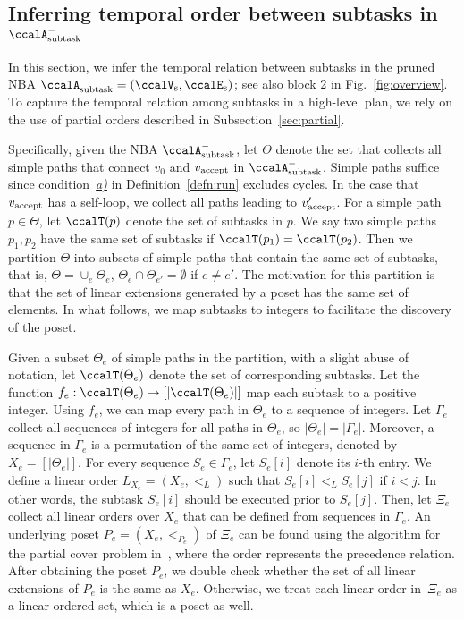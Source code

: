 \documentclass[Afour,sageh,times]{sagej}
\newcommand{\auto}[1]{\ccalA_{\textup{#1}}}
\newcommand{\vertex}[1]{v_{\textup{#1}}}
\begin{document}

\subsection{Inferring temporal order between subtasks in  $\auto{subtask}^-$}\label{sec:poset}
In this section,  we infer the temporal relation between subtasks in the pruned NBA $\auto{subtask}^- = (\ccalV_\text{s}, \ccalE_\text{s})$; see also block 2 in Fig.~\ref{fig:overview}.  To capture the temporal relation among subtasks in a high-level plan,  we rely on the use of partial orders described in Subsection~\ref{sec:partial}.


Specifically, given the NBA $\auto{subtask}^-$, let $\Theta$ denote the set that collects all simple paths that connect $v_0$ and $\vertex{accept}$ in $\auto{subtask}^-$. Simple paths suffice since condition~\hyperref[cond:a]{\it a)} in Definition~\ref{defn:run} excludes cycles. In the case that $\vertex{accept}$ has a self-loop, we collect all paths leading to $\vertex{accept}'$.
For a simple path $p\in\Theta$, let $\ccalT(p)$ denote the set of subtasks in $p$. We say two simple paths $p_1, p_2$ have the same set of subtasks if $\ccalT(p_1) =\ccalT(p_2)$. Then we partition $\Theta$ into subsets of  simple paths that contain the same set of subtasks, that is, $\Theta = \cup_e \Theta_e$, $\Theta_e \cap \Theta_{e'} = \emptyset$ if $e\not=e'$. The motivation for this partition is that the set of linear extensions generated by a poset has the same set of elements. {In what follows, we map subtasks to integers to facilitate the discovery of the  poset.}

Given a subset $\Theta_e$ of simple paths in the partition, with a slight abuse of notation, let $\ccalT(\Theta_e)$ denote the set of corresponding  subtasks. Let the function $f_e:\ccalT(\Theta_e)\to [|\ccalT(\Theta_e)|]$ map each subtask to a positive integer. Using $f_e$, we can map every path in $\Theta_e$ to a sequence of integers. Let $\Gamma_e$ collect all sequences of integers for all paths in $\Theta_e$, so $|\Theta_e| =  |\Gamma_e|$. Moreover, a sequence in $\Gamma_e$ is a permutation of the same set of integers, denoted by $X_e = [|\Theta_e|]$. For every sequence $S_e \in \Gamma_e$, let $S_e[i]$ denote its $i$-th entry. We define a linear order $L_{X_e} = (X_e, <_L)$ such that  $S_e[i]  <_L  S_e[j] $ if $i  <  j$. In other words, the subtask $S_e[i]$ should be executed prior to  $S_e[j]$. Then, let $\Xi_e$ collect all linear orders over $X_e$ that can be defined from sequences in $\Gamma_e$. An underlying poset $P_e  = (X_e, <_{P_e})$ of $\Xi_e$ can be found using the algorithm for the partial cover problem in~\cite{heath2013poset}, where the order represents the precedence relation. After obtaining the poset $P_e$, we double check whether the set of all linear extensions of $P_e$ is the same as $X_e$. Otherwise, we treat each linear order in~$\Xi_e$ as a linear ordered set, which is a poset as well.
\end{document}
